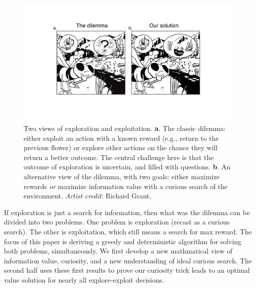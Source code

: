 \begin{figure}
	\begin{fullwidth}
	\includegraphics[width=.55\linewidth]{dilemma-draft-elife/img/bee.pdf} 
	\caption{Two views of exploration and exploitation. \textbf{a}. The classic dilemma: either exploit an action with a known reward (e.g., return to the previous flower) or explore other actions on the chance they will return a better outcome. The central challenge here is that the outcome of exploration is uncertain, and filled with questions. \textbf{b}. An alternative view of the dilemma, with two goals: either maximize rewards \textit{or} maximize information value with a curious search of the environment. \textit{Artist credit}: Richard Grant.}
	\label{fig:bee} 
	\end{fullwidth}
\end{figure}

If exploration is just a search for information, then what was the dilemma can be divided into two problems. One problem is exploration (recast as a curious search). The other is exploitation, which still means a search for max reward. The focus of this paper is deriving a greedy and deterministic algorithm for solving both problems, simultaneously. We first develop a new mathmatical view of information value, curiosity, and a new understanding of ideal curious search. The second half uses these first results to prove our curiosity trick leads to an optimal value solution for nearly all explore-exploit decisions.


